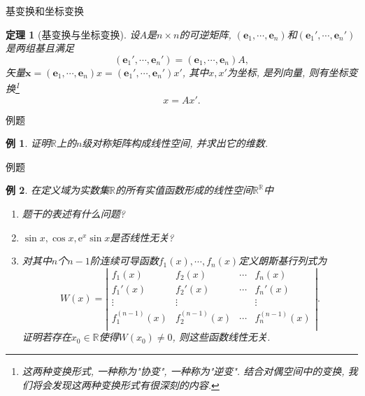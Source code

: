 \documentclass[11pt]{beamer}
\newtheorem{thrm}{定理}[section]
\newtheorem{exmp}{例}[section]
\def\e{\mathrm{e}}
\begin{document}
\begin{frame}{基变换和坐标变换}
	\begin{thrm}[基变换与坐标变换]
		设$A$是$n\times n$的可逆矩阵, $\left(\mathbf{e}_1,\cdots,\mathbf{e}_n\right)$和$\left(\mathbf{e}_1',\cdots,\mathbf{e}_n'\right)$是两组基且满足
		\begin{equation}
		\left(\mathbf{e}_1',\cdots,\mathbf{e}_n'\right)=\left(\mathbf{e}_1,\cdots,\mathbf{e}_n\right)A,
		\end{equation}
		矢量$\mathbf{x}=\left(\mathbf{e}_1,\cdots,\mathbf{e}_n\right)x=\left(\mathbf{e}_1',\cdots,\mathbf{e}_n'\right)x'$, 其中$x,x'$为坐标, 是列向量, 则有坐标变换\footnote{这两种变换形式, 一种称为"协变", 一种称为"逆变". 结合对偶空间中的变换, 我们将会发现这两种变换形式有很深刻的内容.}
		\begin{equation}
		x=Ax'.
		\end{equation}
	\end{thrm}
\end{frame}

\begin{frame}{例题}
	\begin{exmp}
		证明$\mathbb{R}$上的$n$级对称矩阵构成线性空间, 并求出它的维数.
	\end{exmp}
\end{frame}

\begin{frame}{例题}
\begin{exmp}
	在定义域为实数集$\mathbb{R}$的所有实值函数形成的线性空间$\mathbb{R}^\mathbb{R}$中
	\begin{enumerate}
		\item 题干的表述有什么问题?
		\item $\sin x, \cos x, \e^x\sin x$是否线性无关?
		\item 对其中$n$个$n-1$阶连续可导函数$f_1(x),\cdots,f_n(x)$定义朗斯基行列式为
		\begin{equation*}
		W(x)=\left|
		\begin{array}{cccc}
		f_1(x)&f_2(x)&\cdots&f_n(x)\\
		f_1'(x)&f_2'(x)&\cdots&f_n'(x)\\
		\vdots&\vdots&&\vdots\\
		f_1^{(n-1)}(x)&f_2^{(n-1)}(x)&\cdots&f_n^{(n-1)}(x)\\
		\end{array}\right|.
		\end{equation*}
		证明若存在$x_0\in\mathbb{R}$使得$W(x_0)\neq0$, 则这些函数线性无关.
	\end{enumerate}
\end{exmp}
\end{frame}
\end{document}
